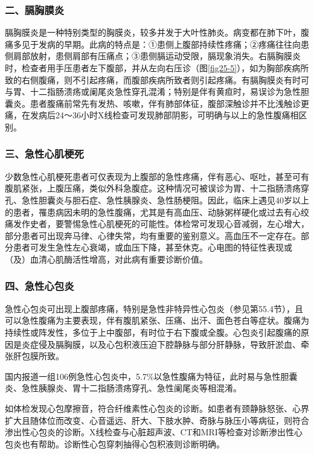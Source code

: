 \subsubsection{二、膈胸膜炎}

膈胸膜炎是一种特别类型的胸膜炎，较多并发于大叶性肺炎。病变都在肺下叶，腹痛多见于发病的早期。此病的特点是：①患侧上腹部持续性疼痛；②疼痛往往向患侧肩部放射，患侧肩部有压痛点；③患侧膈运动受限，膈现象消失。右膈胸膜炎时，检查者用手压患者左下腹部，并从左向右压诊（图\ref{fig25-5}），如为胸部疾病所致的右侧腹痛，则不引起疼痛，而腹部疾病所致者则引起疼痛。有膈胸膜炎有时可与胃、十二指肠溃疡或阑尾炎急性穿孔混淆；特别是伴有黄疸时，易误诊为急性胆囊炎。患者腹痛前常先有发热、咳嗽，伴有肺部体征，腹部深触诊并不比浅触诊更痛，在发病后24～36小时X线检查可发现肺部阴影，可明确与以上的急性腹痛相区别。

\subsubsection{三、急性心肌梗死}

少数急性心肌梗死患者可仅表现为上腹部的急性疼痛，伴有恶心、呕吐，甚至可有腹肌紧张，上腹压痛，类似外科急腹症。这种情况可被误诊为胃、十二指肠溃疡穿孔、急性胆囊炎与胆石症、急性胰腺炎、急性肠梗阻。因此，临床上遇见40岁以上的患者，罹患病因未明的急性腹痛，尤其是有高血压、动脉粥样硬化或过去有心绞痛发作史者，要警惕急性心肌梗死的可能性。体检常可发现心音减弱，左心增大，部分患者可出现奔马律、心律失常，均有重要的鉴别意义。高血压不一定存在。部分患者可发生急性左心衰竭，或血压下降，甚至休克。心电图的特征性表现或（及）血清心肌酶活性增高，对此病有重要诊断价值。

\subsubsection{四、急性心包炎}

急性心包炎可出现上腹部疼痛，特别是急性非特异性心包炎（参见第55.4节），且可以急性腹痛为主要表现，伴有腹肌紧张、压痛、出汗、面色苍白等症状。腹痛为持续性或阵发性，多位于上中腹部，有时位于右下腹或全腹。心包炎引起腹痛的原因是炎症侵及膈胸膜，以及心包积液压迫下腔静脉与部分肝静脉，导致肝淤血、牵张肝包膜所致。

国内报道一组106例急性心包炎中，5.7\%以急性腹痛为特征，此时易与急性胆囊炎、急性胰腺炎、胃十二指肠溃疡穿孔、急性阑尾炎等相混淆。

如体检发现心包摩擦音，符合纤维素性心包炎的诊断。如患者有颈静脉怒张、心界扩大且随体位而改变、心音遥远、肝大、下肢水肿、奇脉与脉压小等病征，则符合渗出性心包炎的诊断。X线检查与心脏超声波、CT和MRI等检查对诊断渗出性心包炎也有帮助。诊断性心包穿刺抽得心包积液则诊断明确。

